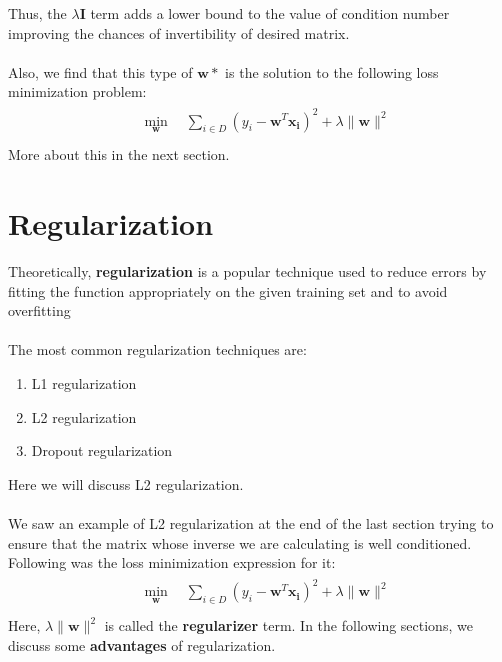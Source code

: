 \documentclass[12pt]{article}
\begin{document}
Thus, the $\lambda\boldsymbol{I}$ term adds a lower bound to the value of condition number improving the chances of invertibility of desired matrix.\\
\\
\noindent Also, we find that this type of $\boldsymbol{w}*$ is the solution to the following loss minimization problem:
\begin{gather}
    \begin{aligned}
        & \min_{\boldsymbol{w}} \quad \sum_{i \in D}   (y_i - \boldsymbol{w}^T\boldsymbol{x_i})^2  + \lambda\|\boldsymbol{w}\|^2           \nonumber\\
    \end{aligned}
\end{gather}
More about this in the next section.

\section{Regularization}

Theoretically, \textbf{regularization} is a popular technique used to reduce errors by fitting the function appropriately on the given training set and to avoid overfitting \\
\\ The most common regularization techniques are:
\begin{enumerate}
    \item L1 regularization
    \item L2 regularization
    \item Dropout regularization
\end{enumerate}

\noindent Here we will discuss L2 regularization.\\
\\
We saw an example of L2 regularization at the end of the last section trying to ensure that the matrix whose inverse we are calculating is well conditioned. Following was the loss minimization expression for it:
\begin{gather}
    \begin{aligned}
        & \min_{\boldsymbol{w}} \quad \sum_{i \in D}   (y_i - \boldsymbol{w}^T\boldsymbol{x_i})^2  + \lambda\|\boldsymbol{w}\|^2           \nonumber\\
    \end{aligned}
\end{gather}
Here, $\lambda\|\boldsymbol{w}\|^2$ is called the \textbf{regularizer} term. In the following sections, we discuss some \textbf{advantages} of regularization.
\end{document}
